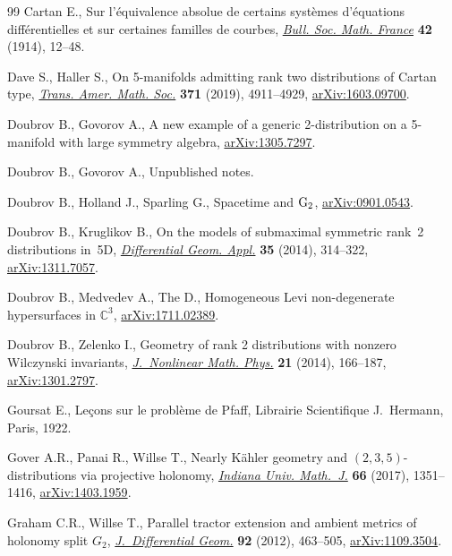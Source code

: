 \begin{thebibliography}{99}
Cartan E., Sur l'\'{e}quivalence absolue de certains syst\`emes d'\'{e}quations
 diff\'{e}rentielles et sur certaines familles de courbes, \href{https://doi.org/10.24033/bsmf.938}{\textit{Bull. Soc.
 Math. France}} \textbf{42} (1914), 12--48.

Dave S., Haller S., On 5-manifolds admitting rank two distributions of {C}artan
 type, \href{https://doi.org/10.1090/tran/7495}{\textit{Trans. Amer. Math. Soc.}} \textbf{371} (2019), 4911--4929,
 \href{https://arxiv.org/abs/1603.09700}{arXiv:1603.09700}.

Doubrov B., Govorov A., A new example of a generic 2-distribution on a
 5-manifold with large symmetry algebra, \href{https://arxiv.org/abs/1305.7297}{arXiv:1305.7297}.

Doubrov B., Govorov A., Unpublished notes.

Doubrov B., Holland J., Sparling G., Spacetime and ${\rm G}_2$,
 \href{https://arxiv.org/abs/0901.0543}{arXiv:0901.0543}.

Doubrov B., Kruglikov B., On the models of submaximal symmetric rank~2
 distributions in~5{D}, \href{https://doi.org/10.1016/j.difgeo.2014.06.008}{\textit{Differential Geom. Appl.}} \textbf{35} (2014),
 314--322, \href{https://arxiv.org/abs/1311.7057}{arXiv:1311.7057}.

Doubrov B., Medvedev A., The D., Homogeneous Levi non-degenerate hypersurfaces
 in ${\mathbb C}^3$, \href{https://arxiv.org/abs/1711.02389}{arXiv:1711.02389}.

Doubrov B., Zelenko I., Geometry of rank 2 distributions with nonzero
 {W}ilczynski invariants, \href{https://doi.org/10.1080/14029251.2014.900985}{\textit{J.~Nonlinear Math. Phys.}} \textbf{21}
 (2014), 166--187, \href{https://arxiv.org/abs/1301.2797}{arXiv:1301.2797}.

Goursat E., Le\c{c}ons sur le probl\`{e}me de {P}faff, Librairie Scientifique
 J.~Hermann, Paris, 1922.

Gover A.R., Panai R., Willse T., Nearly {K}\"{a}hler geometry and
 {$(2,3,5)$}-distributions via projective holonomy, \href{https://doi.org/10.1512/iumj.2017.66.6089}{\textit{Indiana Univ.
 Math.~J.}} \textbf{66} (2017), 1351--1416, \href{https://arxiv.org/abs/1403.1959}{arXiv:1403.1959}.

Graham C.R., Willse T., Parallel tractor extension and ambient metrics of
 holonomy split {$G_2$}, \href{https://doi.org/10.4310/jdg/1354110197}{\textit{J.~Differential Geom.}} \textbf{92} (2012),
 463--505, \href{https://arxiv.org/abs/1109.3504}{arXiv:1109.3504}.


\end{thebibliography}

